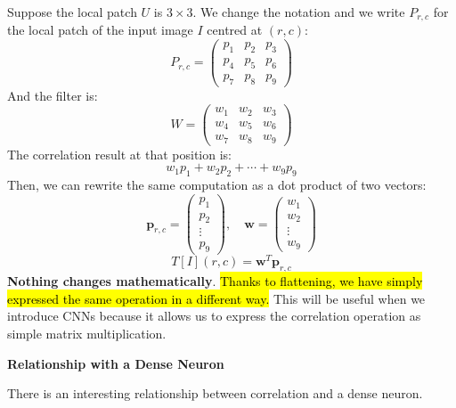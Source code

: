 \highspace
Suppose the local patch $U$ is $3 \times 3$. We change the notation and we write $P_{r,c}$ for the local patch of the input image $I$ centred at $(r,c)$:
\begin{equation*}
    P_{r,c} =
    \begin{pmatrix}
        p_1 & p_2 & p_3 \\
        p_4 & p_5 & p_6 \\
        p_7 & p_8 & p_9
    \end{pmatrix}
\end{equation*}
And the filter is:
\begin{equation*}
    W =
    \begin{pmatrix}
        w_1 & w_2 & w_3 \\
        w_4 & w_5 & w_6 \\
        w_7 & w_8 & w_9
    \end{pmatrix}
\end{equation*}
The correlation result at that position is:
\begin{equation*}
    w_1 p_1 + w_2 p_2 + \cdots + w_9 p_9
\end{equation*}
Then, we can rewrite the same computation as a dot product of two vectors:
\begin{equation*}
    \mathbf{p}_{r,c} = \begin{pmatrix}
        p_1 \\
        p_2 \\
        \vdots \\
        p_9
    \end{pmatrix},
    \quad
    \mathbf{w} = \begin{pmatrix}
        w_1 \\
        w_2 \\
        \vdots \\
        w_9
    \end{pmatrix}
\end{equation*}
\begin{equation*}
    T[I](r,c) = \mathbf{w}^{T} \mathbf{p}_{r,c}
\end{equation*}
\textbf{Nothing changes mathematically}. \hl{Thanks to flattening, we have simply expressed the same operation in a different way.} This will be useful when we introduce CNNs because it allows us to express the correlation operation as simple matrix multiplication.

\highspace
\begin{flushleft}
    \textcolor{Green3}{ \textbf{Relationship with a Dense Neuron}}
\end{flushleft}
There is an interesting relationship between correlation and a dense neuron.

